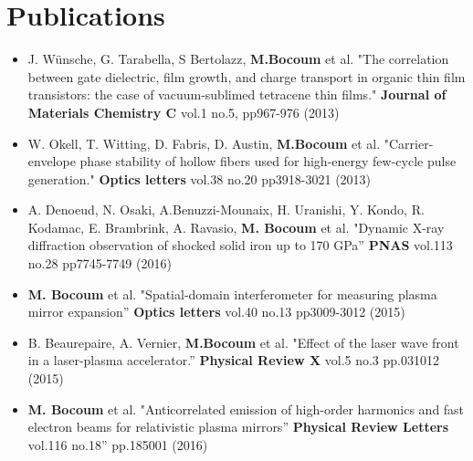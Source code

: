 \documentclass[10pt,a4paper,sans]{moderncv} %
\begin{document}

\section{Publications}

\renewcommand{\listitemsymbol}{-~} %

\begin{itemize}
\item J. Wünsche, G. Tarabella, S Bertolazz, \textbf{M.Bocoum} et al. "The correlation between gate dielectric, film growth, and charge transport in organic thin film transistors: the case of vacuum-sublimed tetracene thin films."  \textbf{Journal of Materials Chemistry C}  vol.1 no.5, pp967-976  (2013) 

\item W. Okell, T. Witting, D. Fabris, D. Austin, \textbf{M.Bocoum} et al. "Carrier-envelope phase stability of hollow fibers used for high-energy few-cycle pulse generation." \textbf{Optics letters} vol.38 no.20 pp3918-3021 (2013)

\item A. Denoeud, N. Osaki, A.Benuzzi-Mounaix, H. Uranishi, Y. Kondo, R. Kodamac, E. Brambrink, A. Ravasio, \textbf{M. Bocoum} et al. "Dynamic X-ray diffraction observation of shocked solid iron up to 170 GPa” \textbf{PNAS} vol.113 no.28 pp7745-7749 (2016)

\item \textbf{M. Bocoum} et al. "Spatial-domain interferometer for measuring plasma mirror expansion” \textbf{Optics letters} vol.40 no.13 pp3009-3012 (2015)

\item B. Beaurepaire, A. Vernier, \textbf{M.Bocoum} et al. "Effect of the laser wave front in a laser-plasma accelerator.” \textbf{Physical Review X} vol.5 no.3 pp.031012 (2015)

\item \textbf{M. Bocoum} et al. "Anticorrelated emission of high-order harmonics and fast electron beams for relativistic plasma mirrors”  \textbf{Physical Review Letters} vol.116 no.18” pp.185001  (2016)


\end{itemize}
\end{document}
